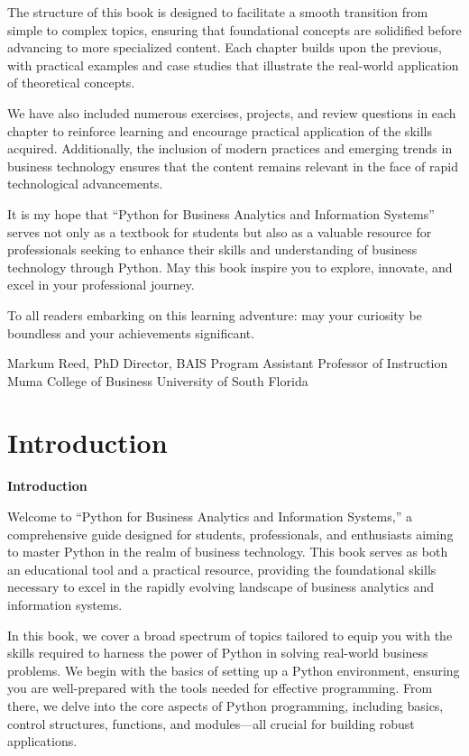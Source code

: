 \documentclass[
  letterpaper,
  DIV=11,
  numbers=noendperiod]{scrreprt}
\begin{document}
The structure of this book is designed to facilitate a smooth transition
from simple to complex topics, ensuring that foundational concepts are
solidified before advancing to more specialized content. Each chapter
builds upon the previous, with practical examples and case studies that
illustrate the real-world application of theoretical concepts.

We have also included numerous exercises, projects, and review questions
in each chapter to reinforce learning and encourage practical
application of the skills acquired. Additionally, the inclusion of
modern practices and emerging trends in business technology ensures that
the content remains relevant in the face of rapid technological
advancements.

It is my hope that ``Python for Business Analytics and Information
Systems'' serves not only as a textbook for students but also as a
valuable resource for professionals seeking to enhance their skills and
understanding of business technology through Python. May this book
inspire you to explore, innovate, and excel in your professional
journey.

To all readers embarking on this learning adventure: may your curiosity
be boundless and your achievements significant.

Markum Reed, PhD Director, BAIS Program Assistant Professor of
Instruction Muma College of Business University of South Florida


\chapter{Introduction}\label{introduction}

\textbf{Introduction}

Welcome to ``Python for Business Analytics and Information Systems,'' a
comprehensive guide designed for students, professionals, and
enthusiasts aiming to master Python in the realm of business technology.
This book serves as both an educational tool and a practical resource,
providing the foundational skills necessary to excel in the rapidly
evolving landscape of business analytics and information systems.

In this book, we cover a broad spectrum of topics tailored to equip you
with the skills required to harness the power of Python in solving
real-world business problems. We begin with the basics of setting up a
Python environment, ensuring you are well-prepared with the tools needed
for effective programming. From there, we delve into the core aspects of
Python programming, including basics, control structures, functions, and
modules---all crucial for building robust applications.
\end{document}
